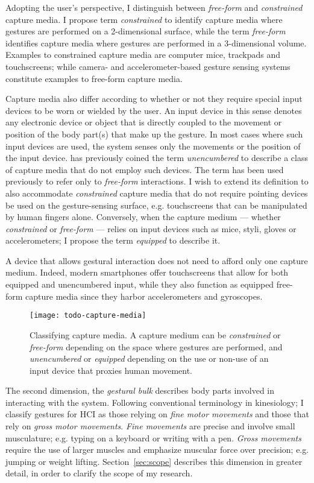 Adopting the user’s perspective, I distinguish between \emph{free-form} and \emph{constrained} capture media. I propose term \emph{constrained} to identify capture media where gestures are performed on a 2-dimensional surface, while the term \emph{free-form} identifies capture media where gestures are performed in a 3-dimensional volume. Examples to constrained capture media are computer mice, trackpads and touchscreens; while camera- and accelerometer-based gesture sensing systems constitute examples to free-form capture media.

Capture media also differ according to whether or not they require special input devices to be worn or wielded by the user. An input device in this sense denotes any electronic device or object that is directly coupled to the movement or position of the body part(s) that make up the gesture. In most cases where such input devices are used, the system senses only the movements or the position of the input device. \textcite{Quek:1996} has previously coined the term \emph{unencumbered} to describe a class of capture media that do not employ such devices. The term has been used previously to refer only to \emph{free-form} interactions. I wish to extend its definition to also accommodate \emph{constrained} capture media that do not require pointing devices be used on the gesture-sensing surface, e.g. touchscreens that can be manipulated by human fingers alone.  Conversely, when the capture medium --– whether \emph{constrained} or \emph{free-form} –-- relies on input devices such as mice, styli, gloves or accelerometers; I propose the term \emph{equipped} to describe it.

A device that allows gestural interaction does not need to afford only one capture medium. Indeed, modern smartphones offer touchscreens that allow for both equipped and unencumbered input, while they also function as equipped free-form capture media since they harbor accelerometers and gyroscopes.

\begin{SCfigure}[\sidecaptionrelwidth][ht]
\centering
\texttt{[image: todo-capture-media]}
\caption{Classifying capture media. A capture medium can be \emph{constrained} or \emph{free-form} depending on the space where gestures are performed, and \emph{unencumbered} or \emph{equipped} depending on the use or non-use of an input device that proxies human movement.}
\label{fig:capture-media}
\end{SCfigure}

The second dimension, the \emph{gestural bulk} describes body parts involved in interacting with the system. Following conventional terminology in kinesiology; I classify gestures for HCI as those relying on \emph{fine motor movements}  and those that rely on \emph{gross motor movements}. \emph{Fine movements} are precise and involve small musculature; e.g. typing on a keyboard or writing with a pen. \emph{Gross movements} require the use of larger muscles and emphasize muscular force over precision; e.g. jumping or weight lifting. Section~\ref{sec:scope} describes this dimension in greater detail, in order to clarify the scope of my research.

